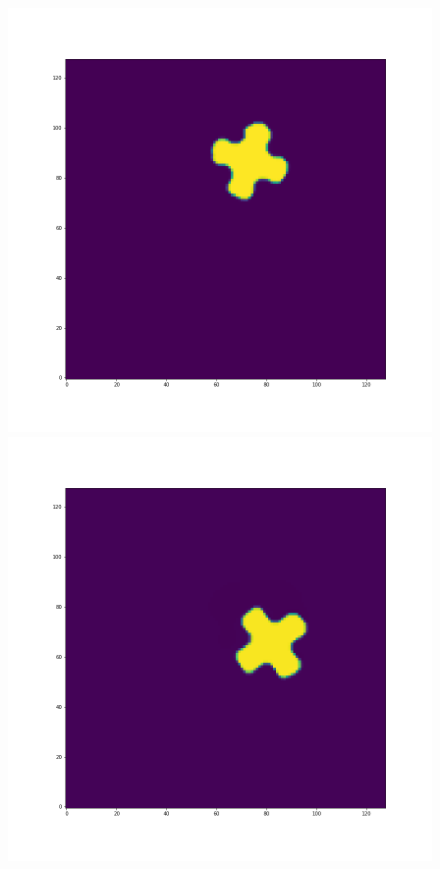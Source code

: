 \documentclass[12pt,a4paper]{article}
\begin{document}
\begin{figure}[H]
\centering
\begin{minipage}{.3\textwidth}
  \centering
  \includegraphics[width=\linewidth]{Pictures/PlusRotateTestTHINC/PlusRotateTest_t30.png}
\end{minipage}%
\begin{minipage}{.3\textwidth}
  \centering
  \includegraphics[width=\linewidth]{Pictures/PlusRotateTestTHINC/PlusRotateTest_t40.png}

\end{minipage}
\end{figure}
\end{document}
